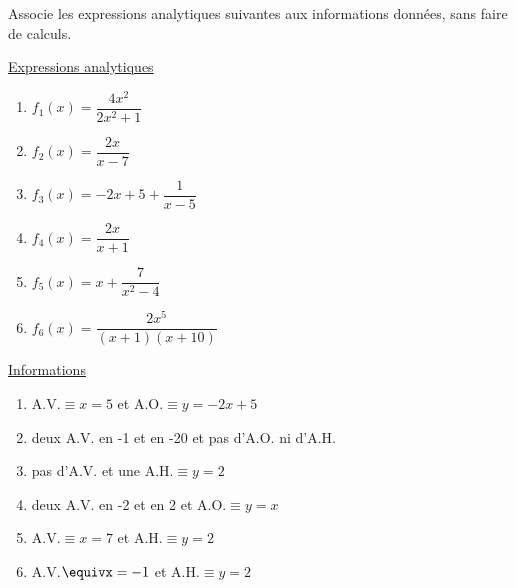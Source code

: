 \documentclass[a4paper,12pt]{report}
\begin{document}
\begin{exercice}
Associe les expressions analytiques suivantes aux informations
données, sans faire de calculs.
\par \setlength{\columnseprule}{0 pt}
          \begin{minipage}[t]{\linewidth}
          \begin{multicols}{2}

\uline{Expressions analytiques}

\begin{enumerate}
\item \(f_1(x)=\dfrac{4x^2}{2x^2+1}\)

\item \(f_2(x)=\dfrac{2x}{x-7}\)

\item \(f_3(x)=-2x+5+\dfrac{1}{x-5}\)

\item \(f_4(x)=\dfrac{2x}{x+1}\)

\item \(f_5(x)=x+\dfrac{7}{x^2-4}\)

\item \(f_6(x)=\dfrac{2x^5}{(x+1)(x+10)}\)
\end{enumerate}

\columnbreak

\uline{Informations}

\begin{enumerate}
\item A.V.\(\equiv x=5\) et A.O.\(\equiv y=-2x+5\)
\item deux A.V. en -1 et en -20 et pas d'A.O. ni d'A.H.
\item pas d'A.V. et une A.H.\(\equiv y=2\)
\item deux A.V. en -2 et en 2 et A.O.\(\equiv y=x\)
\item A.V.\(\equiv x=7\) et A.H.\(\equiv y=2\)
\item A.V.\(\equivx=-1\) et A.H.\(\equiv y=2\)
\end{enumerate}



\end{multicols}\end{minipage}
\end{exercice}
\end{document}
